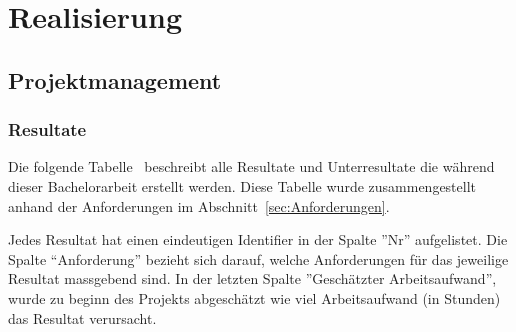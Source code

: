 \chapter{Realisierung}


\section{Projektmanagement}

\subsection{Resultate}

Die folgende Tabelle~ beschreibt alle Resultate und Unterresultate die während dieser Bachelorarbeit erstellt werden.
Diese Tabelle wurde zusammengestellt anhand der Anforderungen im Abschnitt~\ref{sec:Anforderungen}.

Jedes Resultat hat einen eindeutigen Identifier in  der Spalte ''Nr'' aufgelistet.
Die Spalte ``Anforderung'' bezieht sich darauf, welche Anforderungen für das jeweilige Resultat massgebend sind.
In der letzten Spalte ''Geschätzter Arbeitsaufwand'', wurde zu beginn des Projekts abgeschätzt wie viel Arbeitsaufwand (in Stunden) das Resultat verursacht.

